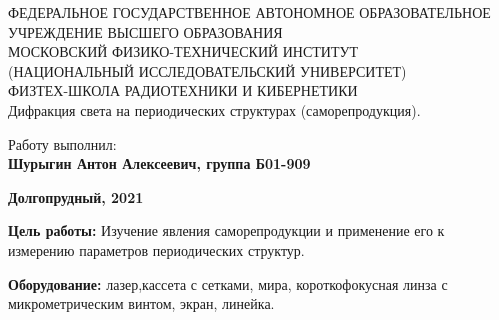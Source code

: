 \documentclass[15pt,a5paper,reqno]{article}
\begin{document}
\begin{center}
  {\small ФЕДЕРАЛЬНОЕ ГОСУДАРСТВЕННОЕ АВТОНОМНОЕ ОБРАЗОВАТЕЛЬНОЕ\\ УЧРЕЖДЕНИЕ ВЫСШЕГО ОБРАЗОВАНИЯ\\ МОСКОВСКИЙ ФИЗИКО-ТЕХНИЧЕСКИЙ ИНСТИТУТ\\ (НАЦИОНАЛЬНЫЙ ИССЛЕДОВАТЕЛЬСКИЙ УНИВЕРСИТЕТ)\\ ФИЗТЕХ-ШКОЛА РАДИОТЕХНИКИ И КИБЕРНЕТИКИ}\\
  \hfill \break
  \hfill \break
  \hfill \break
  \Huge{Дифракция света на периодических структурах (саморепродукция).}\\
\end{center}

\hfill \break
\hfill \break
\hfill \break
\hfill \break
\hfill \break
\hfill \break

\begin{flushright}
  \normalsize{Работу выполнил:}\\
  \normalsize{\textbf{Шурыгин Антон Алексеевич, группа Б01-909}}\\
\end{flushright}

\begin{center}
  \normalsize{\textbf{Долгопрудный, 2021}}
\end{center}


\thispagestyle{empty} %


\newpage
\thispagestyle{plain}
\tableofcontents
\thispagestyle{plain}
\newpage


\textbf{Цель работы:}
Изучение явления саморепродукции и применение его к измерению параметров периодических структур.

\textbf{Оборудование:} лазер,кассета с сетками, мира, короткофокусная линза с микрометрическим винтом, экран, линейка.
\end{document}
